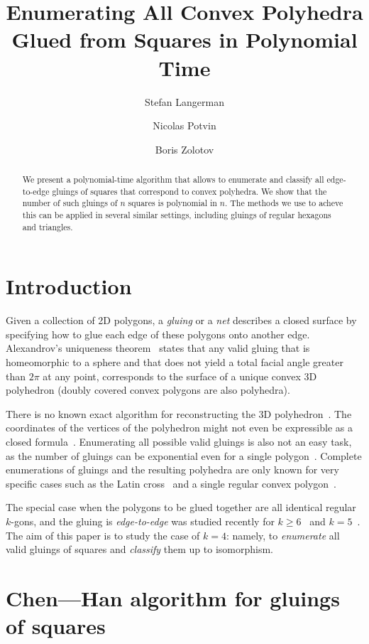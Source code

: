 \documentclass[a4paper,USenglish,cleveref, autoref, thm-restate]{socg-lipics-v2019}
\title{Enumerating All Convex Polyhedra Glued from Squares in Polynomial Time}
\author{Stefan Langerman}{Faculté des Sciences, Université Libre de Bruxelles}{stefan.langerman@ulb.ac.be}{ }{Whatever grant}
\author{Nicolas Potvin}{Faculté des Sciences, Université Libre de Bruxelles}{potvinnicolas2@gmail.com}{ }{Whatever grant}
\author{Boris Zolotov}{Department of Mathematics and Computer Sciences, St. Petersburg State University}{boris.a.zolotov@yandex.com}{ }{Whatever grant}
\begin{document}
\maketitle

\begin{abstract}We present a polynomial-time algorithm that allows to enumerate and classify all edge-to-edge gluings of squares that correspond to convex polyhedra. We show that the number of such gluings of $n$ squares is polynomial in $n$. The methods we use to acheve this can be applied in several similar settings, including gluings of regular hexagons and triangles.\end{abstract}

\section{Introduction}

Given a collection of 2D polygons, a \emph{gluing} or a \emph{net} describes a closed surface by specifying how to glue each edge of these polygons onto another edge. Alexandrov's uniqueness theorem~\cite{alex} states that any valid gluing that is homeomorphic to a sphere and that does not yield a total facial angle greater than $2\pi$ at any point, corresponds to the surface of a unique convex 3D polyhedron (doubly covered convex polygons are also polyhedra).

There is no known exact algorithm for reconstructing the 3D polyhedron~\cite{kpd09-approx}. The coordinates of the vertices of the polyhedron might not even be expressible as a closed formula~\cite{bannister2014galois}. Enumerating all possible valid gluings is also not an easy task, as the number of gluings can be exponential even for a single polygon~\cite{DDLO02}. Complete enumerations of gluings and the resulting polyhedra are only known for very specific cases such as the Latin cross~\cite{ddlop99} and a single regular convex polygon~\cite{DO07}.

The special case when the polygons to be glued together are all identical regular $k$-gons, and the gluing is \emph{edge-to-edge} was studied recently for $k \ge 6$~\cite{kl17-hex} and $k=5$~\cite{alz-penta}. The aim of this paper is to study the case of $k=4$: namely, to {\it enumerate} all valid gluings of squares and {\it classify} them up to isomorphism.

\section{Chen—Han algorithm for gluings of squares}
\end{document}
